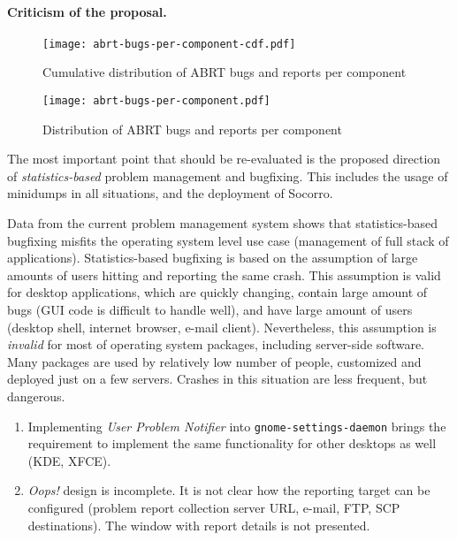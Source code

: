 \documentclass{article}
\begin{document}
\paragraph{Criticism of the proposal.}
\begin{figure}[h!]
\centering
\texttt{[image: abrt-bugs-per-component-cdf.pdf]}
\caption{Cumulative distribution of ABRT bugs and reports per
  component}
\label{fig:cumulative}
\end{figure}

\begin{figure}[h!]
\centering
\texttt{[image: abrt-bugs-per-component.pdf]}
\caption{Distribution of ABRT bugs and reports per component}
\label{fig:distribution}
\end{figure}

The most important point that should be re-evaluated is the proposed
direction of \emph{statistics-based} problem management and
bugfixing. This includes the usage of minidumps in all situations, and
the deployment of Socorro.

Data from the current problem management system shows that
statistics-based bugfixing misfits the operating system level use case
(management of full stack of applications).  Statistics-based
bugfixing is based on the assumption of large amounts of users hitting
and reporting the same crash.  This assumption is valid for desktop
applications, which are quickly changing, contain large amount of bugs
(GUI code is difficult to handle well), and have large amount of users
(desktop shell, internet browser, e-mail client).  Nevertheless, this
assumption is \emph{invalid} for most of operating system packages,
including server-side software. Many packages are used by relatively
low number of people, customized and deployed just on a few servers.
Crashes in this situation are less frequent, but dangerous.

\begin{enumerate}
\item Implementing \emph{User Problem Notifier} into
  \texttt{gnome-settings-daemon} brings the requirement to implement
  the same functionality for other desktops as well (KDE, XFCE).
\item \emph{Oops!} design is incomplete. It is not clear how the
  reporting target can be configured (problem report collection server
  URL, e-mail, FTP, SCP destinations).  The window with report details
  is not presented.
\end{enumerate}
\end{document}
